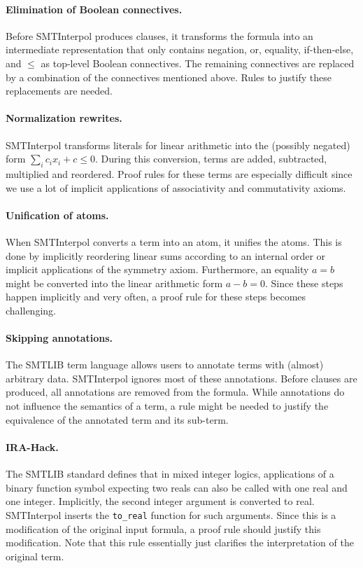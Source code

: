 \documentclass[a4paper]{article}
\newcommand\si{SMTInterpol\xspace}
\begin{document}
\paragraph{Elimination of Boolean connectives.}  Before \si produces clauses,
it transforms the formula into an intermediate representation that only
contains negation, or, equality, if-then-else, and $\leq$ as top-level Boolean
connectives.  The remaining connectives are replaced by a combination of the
connectives mentioned above.  Rules to justify these replacements are needed.

\paragraph{Normalization rewrites.}  \si transforms literals for linear
arithmetic into the (possibly negated) form $\sum_i c_i x_i + c\leq 0$.
During this conversion, terms are added, subtracted, multiplied and reordered.
Proof rules for these terms are especially difficult since we use a lot of
implicit applications of associativity and commutativity axioms.

\paragraph{Unification of atoms.}  When \si converts a term into an atom, it
unifies the atoms.  This is done by implicitly reordering linear sums
according to an internal order or implicit applications of the symmetry
axiom.  Furthermore, an equality $a=b$ might be converted into the linear
arithmetic form $a-b=0$.  Since these steps happen implicitly and very often,
a proof rule for these steps becomes challenging.

\paragraph{Skipping annotations.}  The SMTLIB term language allows users to
annotate terms with (almost) arbitrary data.  \si ignores most of these
annotations.  Before clauses are produced, all annotations are removed
from the formula.  While annotations do not influence the semantics of a term,
a rule might be needed to justify the equivalence of the annotated term and
its sub-term.

\paragraph{IRA-Hack.}  The SMTLIB standard defines that in mixed integer
logics, applications of a binary function symbol expecting two reals can also
be called with one real and one integer.  Implicitly, the second integer
argument is converted to real.  \si inserts the \verb+to_real+ function for
such arguments.  Since this is a modification of the original input formula, a
proof rule should justify this modification.  Note that this rule essentially
just clarifies the interpretation of the original term.
\end{document}
